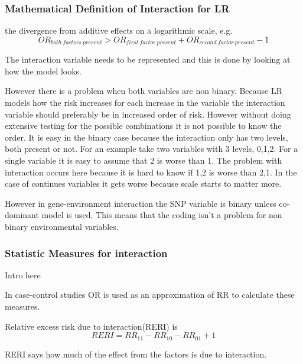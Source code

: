 \documentclass[10pt,a4paper]{report}
\begin{document}
\subsubsection{Mathematical Definition of Interaction for LR}
\label{additive}


the divergence from additive effects on a logarithmic scale, e.g.
\begin{equation}
OR_{both\:factors\:present}>OR_{first\:factor\:present}+OR_{second\:factor\:present}-1
\end{equation}
\cite{rothman1998modern}

The interaction variable needs to be represented and this is done by looking at how the model looks.



However there is a problem when both variables are non binary. Because LR models how the risk increases for each increase in the variable the interaction variable should preferably be in increased order of risk. However without doing extensive testing for the possible combinations it is not possible to know the order. It is easy in the binary case because the interaction only has two levels, both present or not. For an example take two variables with 3 levels, 0,1,2. For a single variable it is easy to assume that 2 is worse than 1. The problem with interaction occurs here because it is hard to know if 1,2 is worse than 2,1. In the case of continues variables it gets worse because scale starts to matter more.

However in gene-environment interaction the SNP variable is binary unless co-dominant model is used. This means that the coding isn't a problem for non binary environmental variables.

\subsubsection{Statistic Measures for interaction}
Intro here

In case-control studies OR is used as an approximation of RR to calculate these measures.

Relative  excess risk due to interaction(RERI) is
\begin{equation}
RERI=RR_{11}-RR_{10}-RR_{01}+1
\end{equation}

RERI says how much of the effect from the factors is due to interaction.
\end{document}
